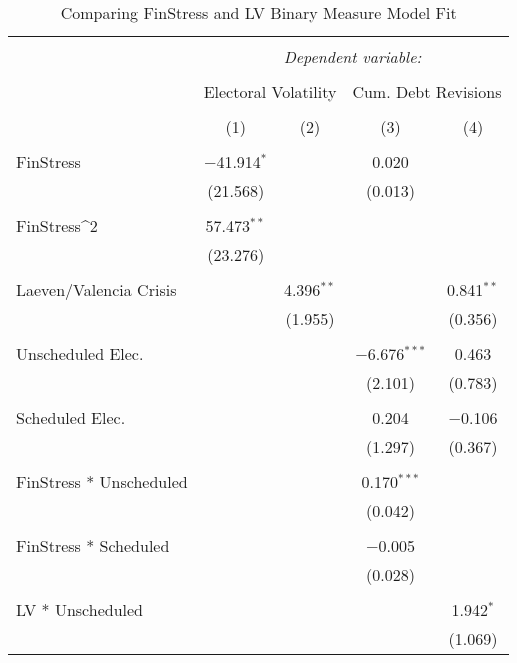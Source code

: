 
\begin{table}[!htbp] \centering 
  \caption{ Comparing FinStress and LV Binary Measure Model Fit} 
  \label{finlvregcompare} 
\tiny 
\begin{tabular}{@{\extracolsep{5pt}}lcccc} 
\\[-1.8ex]\hline 
\hline \\[-1.8ex] 
 & \multicolumn{4}{c}{\textit{Dependent variable:}} \\ 
\cline{2-5} 
\\[-1.8ex] & \multicolumn{2}{c}{Electoral Volatility} & \multicolumn{2}{c}{Cum. Debt Revisions} \\ 
\\[-1.8ex] & (1) & (2) & (3) & (4)\\ 
\hline \\[-1.8ex] 
 FinStress & $-$41.914$^{*}$ &  & 0.020 &  \\ 
  & (21.568) &  & (0.013) &  \\ 
  & & & & \\ 
 FinStress$\^2$ & 57.473$^{**}$ &  &  &  \\ 
  & (23.276) &  &  &  \\ 
  & & & & \\ 
 Laeven/Valencia Crisis &  & 4.396$^{**}$ &  & 0.841$^{**}$ \\ 
  &  & (1.955) &  & (0.356) \\ 
  & & & & \\ 
 Unscheduled Elec. &  &  & $-$6.676$^{***}$ & 0.463 \\ 
  &  &  & (2.101) & (0.783) \\ 
  & & & & \\ 
 Scheduled Elec. &  &  & 0.204 & $-$0.106 \\ 
  &  &  & (1.297) & (0.367) \\ 
  & & & & \\ 
 FinStress * Unscheduled &  &  & 0.170$^{***}$ &  \\ 
  &  &  & (0.042) &  \\ 
  & & & & \\ 
 FinStress * Scheduled &  &  & $-$0.005 &  \\ 
  &  &  & (0.028) &  \\ 
  & & & & \\ 
 LV * Unscheduled &  &  &  & 1.942$^{*}$ \\ 
  &  &  &  & (1.069) \\ 

\end{tabular}
\end{table}
